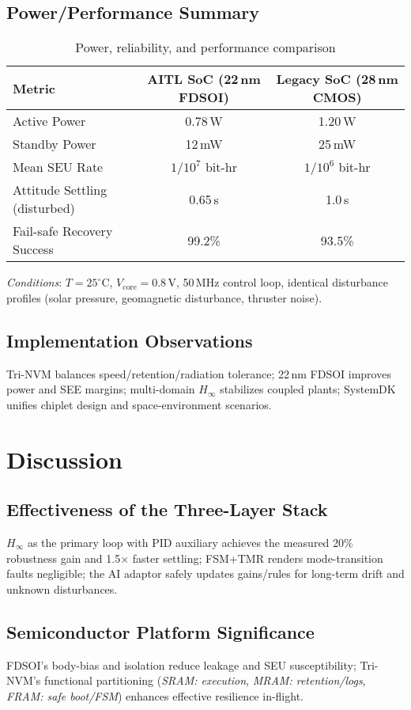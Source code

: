 \documentclass[conference]{IEEEtran}
\begin{document}
\subsection{Power/Performance Summary}
\begin{table}[t]
\centering
\caption{Power, reliability, and performance comparison}
\label{tab:power}
\begin{tabular}{lcc}
\toprule
Metric & AITL SoC (22\,nm FDSOI) & Legacy SoC (28\,nm CMOS)\\
\midrule
Active Power & 0.78\,W & 1.20\,W \\
Standby Power & 12\,mW & 25\,mW \\
Mean SEU Rate & $1/10^7$ bit-hr & $1/10^6$ bit-hr \\
Attitude Settling (disturbed) & 0.65\,s & 1.0\,s \\
Fail-safe Recovery Success & 99.2\% & 93.5\% \\
\bottomrule
\end{tabular}

\vspace{2pt}\footnotesize \emph{Conditions}:
$T=25^\circ$C, $V_{\mathrm{core}}=0.8$\,V, 50\,MHz control loop, identical disturbance
profiles (solar pressure, geomagnetic disturbance, thruster noise).
\end{table}

\subsection{Implementation Observations}
Tri-NVM balances speed/retention/radiation tolerance; 22\,nm FDSOI improves power
and SEE margins; multi-domain $H_\infty$ stabilizes coupled plants; SystemDK unifies
chiplet design and space-environment scenarios.

\section{Discussion}
\subsection{Effectiveness of the Three-Layer Stack}
$H_\infty$ as the primary loop with PID auxiliary achieves the measured 20\% robustness
gain and 1.5$\times$ faster settling; FSM+TMR renders mode-transition faults negligible;
the AI adaptor safely updates gains/rules for long-term drift and unknown disturbances.

\subsection{Semiconductor Platform Significance}
FDSOI’s body-bias and isolation reduce leakage and SEU susceptibility; Tri-NVM’s
functional partitioning (\emph{SRAM: execution}, \emph{MRAM: retention/logs},
\emph{FRAM: safe boot/FSM}) enhances effective resilience in-flight.
\end{document}
